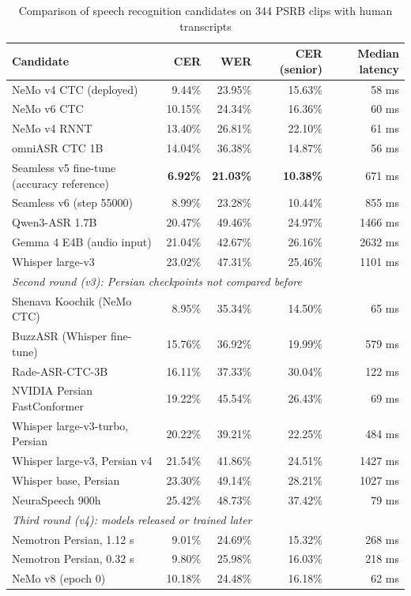 \begin{table}[ht]
\centering
\caption{Comparison of speech recognition candidates on 344 PSRB clips with human
         transcripts}
\label{tab:asr-v2}
\small
\begin{tabular}{lrrrr}
\toprule
Candidate & CER & WER & CER (senior) & Median latency \\
\midrule
NeMo v4 CTC (deployed) & 9.44\% & 23.95\% & 15.63\% & 58 ms \\
NeMo v6 CTC & 10.15\% & 24.34\% & 16.36\% & 60 ms \\
NeMo v4 RNNT & 13.40\% & 26.81\% & 22.10\% & 61 ms \\
omniASR CTC 1B & 14.04\% & 36.38\% & 14.87\% & 56 ms \\
Seamless v5 fine-tune (accuracy reference) & \textbf{6.92\%} & \textbf{21.03\%} & \textbf{10.38\%} & 671 ms \\
Seamless v6 (step 55000) & 8.99\% & 23.28\% & 10.44\% & 855 ms \\
Qwen3-ASR 1.7B & 20.47\% & 49.46\% & 24.97\% & 1466 ms \\
Gemma 4 E4B (audio input) & 21.04\% & 42.67\% & 26.16\% & 2632 ms \\
Whisper large-v3 & 23.02\% & 47.31\% & 25.46\% & 1101 ms \\
\midrule
\multicolumn{5}{l}{\emph{Second round (v3): Persian checkpoints not compared before}} \\
Shenava Koochik (NeMo CTC) & 8.95\% & 35.34\% & 14.50\% & 65 ms \\
BuzzASR (Whisper fine-tune) & 15.76\% & 36.92\% & 19.99\% & 579 ms \\
Rade-ASR-CTC-3B & 16.11\% & 37.33\% & 30.04\% & 122 ms \\
NVIDIA Persian FastConformer & 19.22\% & 45.54\% & 26.43\% & 69 ms \\
Whisper large-v3-turbo, Persian & 20.22\% & 39.21\% & 22.25\% & 484 ms \\
Whisper large-v3, Persian v4 & 21.54\% & 41.86\% & 24.51\% & 1427 ms \\
Whisper base, Persian & 23.30\% & 49.14\% & 28.21\% & 1027 ms \\
NeuraSpeech 900h & 25.42\% & 48.73\% & 37.42\% & 79 ms \\
\midrule
\multicolumn{5}{l}{\emph{Third round (v4): models released or trained later}} \\
Nemotron Persian, 1.12 s & 9.01\% & 24.69\% & 15.32\% & 268 ms \\
Nemotron Persian, 0.32 s & 9.80\% & 25.98\% & 16.03\% & 218 ms \\
NeMo v8 (epoch 0) & 10.18\% & 24.48\% & 16.18\% & 62 ms \\
\bottomrule
\end{tabular}
\end{table}

